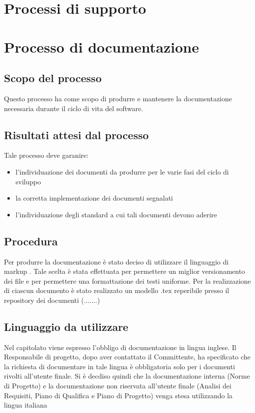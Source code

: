 \section{Processi di supporto}
\section{Processo di documentazione}
\subsection{Scopo del processo}
Questo processo ha come scopo di produrre e mantenere la documentazione necessaria durante il ciclo di vita del software.
\subsection{Risultati attesi dal processo}
Tale processo deve garanire:
\begin{itemize}
\item l'individuazione dei documenti da produrre per le varie fasi del ciclo di sviluppo
\item la corretta implementazione dei documenti segnalati
\item l'individuazione degli standard a cui tali documenti devono aderire
\end{itemize}
  \subsection{Procedura}
  Per produrre la documentazione è stato deciso di utilizzare il linguaggio di markup . Tale scelta è stata effettuata per permettere un miglior versionamento dei file e per permettere una formattazione dei testi uniforme.
  Per la realizzazione di ciascun documento \`e stato realizzato un modello .tex reperibile presso il repository dei documenti (.......)

  \subsection{Linguaggio da utilizzare}
  Nel capitolato viene espresso l'obbligo di documentazione in lingua inglese. Il Responsabile di progetto, dopo aver contattato il Committente, ha specificato che la richiesta di documentare in tale lingua è obbligatoria solo per i documenti rivolti all'utente finale. Si è decdiso quindi che la documentazione interna (Norme di Progetto) e la documentazione non riservata all'utente finale (Analisi dei Requisiti, Piano di Qualifica e Piano di Progetto) venga stesa utilizzando la lingua italiana  
  
